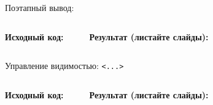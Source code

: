 \begin{frame}[fragile,label=pause]{Поэтапный вывод: }
  \begin{columns}[T,onlytextwidth]
      \textbf{Исходный код:}
      \vspace{0.2em}
      \inputminted[fontsize=\scriptsize, frame=single, breaklines=true]{latex}{examples/pause.tex}

      \textbf{Результат (листайте слайды):}
      \vspace{0.2em}
      \begin{block}{}
        
      \end{block}
  \end{columns}
\end{frame}

\begin{frame}[fragile,label=overlays]{Управление видимостью: \texttt{<...>}}
  \begin{columns}[T,onlytextwidth]
      \textbf{Исходный код:}
      \vspace{0.2em}
      \inputminted[fontsize=\scriptsize, frame=single, breaklines=true]{latex}{examples/overlays.tex}

      \textbf{Результат (листайте слайды):}
      \vspace{0.2em}
      \begin{block}{}
        
      \end{block}
  \end{columns}
\end{frame}